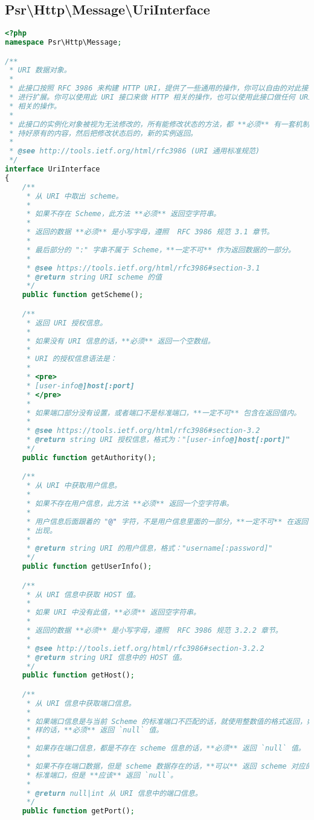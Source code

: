 \subsection{Psr\textbackslash Http\textbackslash Message\textbackslash UriInterface}


\begin{lstlisting}[language=PHP]
<?php
namespace Psr\Http\Message;

/**
 * URI 数据对象。
 *
 * 此接口按照 RFC 3986 来构建 HTTP URI，提供了一些通用的操作，你可以自由的对此接口
 * 进行扩展。你可以使用此 URI 接口来做 HTTP 相关的操作，也可以使用此接口做任何 URI 
 * 相关的操作。
 *
 * 此接口的实例化对象被视为无法修改的，所有能修改状态的方法，都 **必须** 有一套机制，在内部保
 * 持好原有的内容，然后把修改状态后的，新的实例返回。
 *
 * @see http://tools.ietf.org/html/rfc3986 (URI 通用标准规范)
 */
interface UriInterface
{
    /**
     * 从 URI 中取出 scheme。
     *
     * 如果不存在 Scheme，此方法 **必须** 返回空字符串。
     *
     * 返回的数据 **必须** 是小写字母，遵照  RFC 3986 规范 3.1 章节。
     *
     * 最后部分的 ":" 字串不属于 Scheme，**一定不可** 作为返回数据的一部分。
     *
     * @see https://tools.ietf.org/html/rfc3986#section-3.1
     * @return string URI scheme 的值
     */
    public function getScheme();

    /**
     * 返回 URI 授权信息。
     *
     * 如果没有 URI 信息的话，**必须** 返回一个空数组。
     *
     * URI 的授权信息语法是：
     *
     * <pre>
     * [user-info@]host[:port]
     * </pre>
     *
     * 如果端口部分没有设置，或者端口不是标准端口，**一定不可** 包含在返回值内。
     *
     * @see https://tools.ietf.org/html/rfc3986#section-3.2
     * @return string URI 授权信息，格式为："[user-info@]host[:port]" 
     */
    public function getAuthority();

    /**
     * 从 URI 中获取用户信息。
     *
     * 如果不存在用户信息，此方法 **必须** 返回一个空字符串。
     *
     * 用户信息后面跟着的 "@" 字符，不是用户信息里面的一部分，**一定不可** 在返回值里
     * 出现。
     *
     * @return string URI 的用户信息，格式："username[:password]" 
     */
    public function getUserInfo();

    /**
     * 从 URI 信息中获取 HOST 值。
     *
     * 如果 URI 中没有此值，**必须** 返回空字符串。
     *
     * 返回的数据 **必须** 是小写字母，遵照  RFC 3986 规范 3.2.2 章节。
     *
     * @see http://tools.ietf.org/html/rfc3986#section-3.2.2
     * @return string URI 信息中的 HOST 值。
     */
    public function getHost();

    /**
     * 从 URI 信息中获取端口信息。
     *
     * 如果端口信息是与当前 Scheme 的标准端口不匹配的话，就使用整数值的格式返回，如果是一
     * 样的话，**必须** 返回 `null` 值。
     * 
     * 如果存在端口信息，都是不存在 scheme 信息的话，**必须** 返回 `null` 值。
     * 
     * 如果不存在端口数据，但是 scheme 数据存在的话，**可以** 返回 scheme 对应的
     * 标准端口，但是 **应该** 返回 `null`。
     * 
     * @return null|int 从 URI 信息中的端口信息。
     */
    public function getPort();


\end{lstlisting}

